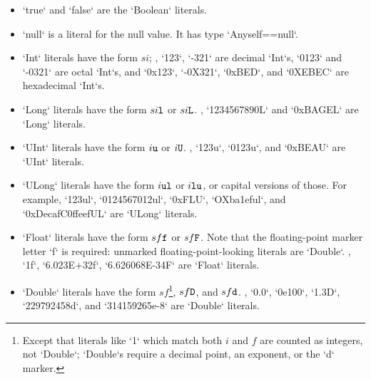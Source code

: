 \begin{itemize}

\item \xcd`true` and \xcd`false` are the \xcd`Boolean` literals.

\item \xcd`null` is a literal for the null value.  It has type
      \xcd`Any{self==null}`. 

\item \xcd`Int` literals have the form {$si$}; \eg, \xcd`123`,
      \xcd`-321` are decimal \xcd`Int`s, \xcd`0123` and \xcd`-0321` are octal
      \xcd`Int`s, and \xcd`0x123`, \xcd`-0X321`,  \xcd`0xBED`, and \xcd`0XEBEC` are
      hexadecimal \xcd`Int`s.  

\item \xcd`Long` literals have the form {$si{\tt l}$} or
      {$si{\tt L}$}. \Eg, \xcd`1234567890L`  and \xcd`0xBAGEL` are \xcd`Long` literals. 

\item \xcd`UInt` literals have the form {$i{\tt u}$} or {$i {\tt U}$}.
      \Eg, \xcd`123u`, \xcd`0123u`, and \xcd`0xBEAU` are \xcd`UInt` literals.

\item \xcd`ULong` literals have the form {$i {\tt ul}$} or {$i {\tt
      lu}$}, or capital versions of those.  For example, 
      \xcd`123ul`, \xcd`0124567012ul`,  \xcd`0xFLU`, \xcd`OXba1eful`, and \xcd`0xDecafC0ffeefUL` are \xcd`ULong`
      literals. 

\item \xcd`Float` literals have the form {$s f {\tt f}$} or  {$s
      f {\tt F}$}.  Note that the floating-point marker letter \xcd`f` is
      required: unmarked floating-point-looking literals are \xcd`Double`. 
      \Eg, \xcd`1f`, \xcd`6.023E+32f`, \xcd`6.626068E-34F` are \xcd`Float`
      literals. 

\item \xcd`Double` literals have the form {$s f$}\footnote{Except that
      literals like \xcd`1` 
      which match both {$i$} and {$f$} are counted as
      integers, not \xcd`Double`; \xcd`Double`s require a decimal
      point, an exponent, or the \xcd`d` marker.
      }, {$s f {\tt
      D}$}, and {$s f {\tt d}$}.  
      \Eg, \xcd`0.0`, \xcd`0e100`, \xcd`1.3D`,  \xcd`229792458d`, and \xcd`314159265e-8`
      are \xcd`Double` literals.


\end{itemize}
